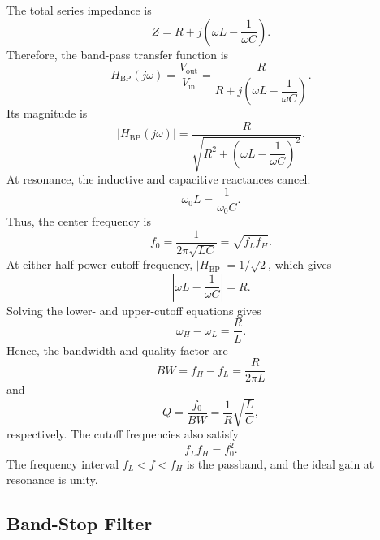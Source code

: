 \documentclass[12pt,a4paper]{article}
\begin{document}
	The total series impedance is
	\begin{equation}
		Z=R+j\left(\omega L-\frac{1}{\omega C}\right).
		\label{eq:rlc-total-z}
	\end{equation}
	Therefore, the band-pass transfer function is
	\begin{equation}
		H_{\mathrm{BP}}(j\omega)
		=\frac{V_{\mathrm{out}}}{V_{\mathrm{in}}}
		=\frac{R}{R+j\left(\omega L-\dfrac{1}{\omega C}\right)}.
		\label{eq:bp-transfer}
	\end{equation}
	Its magnitude is
	\begin{equation}
		|H_{\mathrm{BP}}(j\omega)|
		=\frac{R}{\sqrt{R^2+\left(\omega L-\dfrac{1}{\omega C}\right)^2}}.
		\label{eq:bp-magnitude}
	\end{equation}
	At resonance, the inductive and capacitive reactances cancel:
	\begin{equation}
		\omega_0L=\frac{1}{\omega_0C}.
		\label{eq:resonance-condition}
	\end{equation}
	Thus, the center frequency is
	\begin{equation}
		f_0=\frac{1}{2\pi\sqrt{LC}}=\sqrt{f_Lf_H}.
		\label{eq:rlc-f0}
	\end{equation}
	At either half-power cutoff frequency, $|H_{\mathrm{BP}}|=1/\sqrt{2}$, which gives
	\begin{equation}
		\left|\omega L-\frac{1}{\omega C}\right|=R.
		\label{eq:rlc-cutoff-condition}
	\end{equation}
	Solving the lower- and upper-cutoff equations gives
	\begin{equation}
		\omega_H-\omega_L=\frac{R}{L}.
		\label{eq:rlc-angular-bw}
	\end{equation}
	Hence, the bandwidth and quality factor are
	\begin{equation}
		BW=f_H-f_L=\frac{R}{2\pi L}
		\label{eq:rlc-bw}
	\end{equation}
	and
	\begin{equation}
		Q=\frac{f_0}{BW}=\frac{1}{R}\sqrt{\frac{L}{C}},
		\label{eq:rlc-q}
	\end{equation}
	respectively. The cutoff frequencies also satisfy
	\begin{equation}
		f_Lf_H=f_0^2.
		\label{eq:rlc-cutoff-product}
	\end{equation}
	The frequency interval $f_L<f<f_H$ is the passband, and the ideal gain at resonance is unity.
	
	\subsection{Band-Stop Filter}
	
\end{document}
